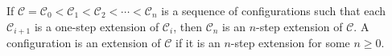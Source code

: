 If $\mathcal{C} = \mathcal{C}_0 < \mathcal{C}_1 < \mathcal{C}_2 < \cdots < \mathcal{C}_n$ is a sequence of configurations such that each $\mathcal{C}_{i+1}$ is a one-step extension of $\mathcal{C}_i$, then $\mathcal{C}_n$ is an $n$-step extension of $\mathcal{C}$. A configuration is an extension of $\mathcal{C}$ if it is an $n$-step extension for some $n \geq 0$.
